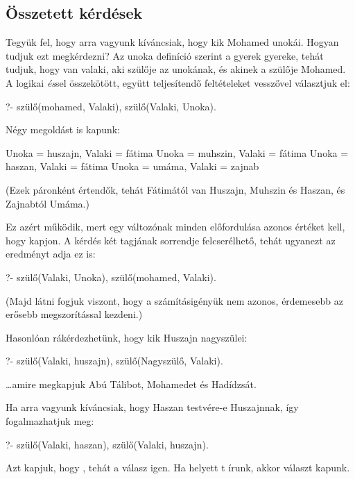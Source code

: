 \subsection*{Összetett kérdések}

Tegyük fel, hogy arra vagyunk kíváncsiak, hogy kik
Mohamed unokái. Hogyan tudjuk ezt megkérdezni? Az
unoka definíció szerint a gyerek gyereke, tehát
tudjuk, hogy van valaki, aki szülője az unokának, és
akinek a szülője Mohamed. A logikai \emph{és}\/sel
összekötött, együtt teljesítendő feltételeket
vesszővel választjuk el:
\begin{query}
?- szülő(mohamed, Valaki), szülő(Valaki, Unoka).
\end{query}
Négy megoldást is kapunk:
\begin{query}
Unoka = huszajn,
Valaki = fátima
Unoka = muhszin,
Valaki = fátima
Unoka = haszan,
Valaki = fátima
Unoka = umáma,
Valaki = zajnab
\end{query}
(Ezek páronként értendők, tehát Fátimától van
Huszajn, Muhszin és Haszan, és Zajnabtól Umáma.)

Ez azért működik, mert egy változónak minden
előfordulása azonos értéket kell, hogy kapjon.
A kérdés két tagjának sorrendje felcserélhető, tehát
ugyanezt az eredményt adja ez is:
\begin{query}
?- szülő(Valaki, Unoka), szülő(mohamed, Valaki).
\end{query}
(Majd látni fogjuk viszont, hogy a számításigényük
nem azonos, érdemesebb az erősebb megszorítással
kezdeni.)

Hasonlóan rákérdezhetünk, hogy kik Huszajn
nagyszülei:
\begin{query}
?- szülő(Valaki, huszajn), szülő(Nagyszülő, Valaki).
\end{query}
\dots amire megkapjuk Abú Tálibot, Mohamedet és
Hadídzsát.

Ha arra vagyunk kíváncsiak, hogy Haszan testvére-e
Huszajnnak, így fogalmazhatjuk meg:
\begin{query}
?- szülő(Valaki, haszan), szülő(Valaki, huszajn).
\end{query}
Azt kapjuk, hogy , tehát a válasz
igen. Ha  helyett t írunk,
akkor  választ kapunk.

